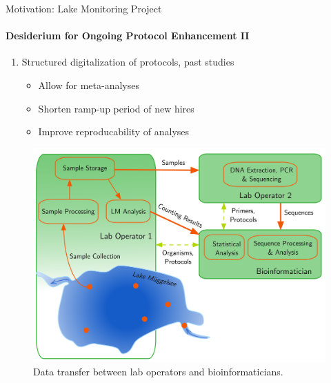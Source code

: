 \documentclass[xcolor=dvipsnames,envcountsect]{beamer}
\begin{document}
\begin{frame}{Motivation: Lake Monitoring Project}
\framesubtitle{Desiderium for Ongoing Protocol Enhancement II}
\begin{enumerate}[II]
    \item Structured digitalization of protocols, past studies
    \begin{itemize}
        \item Allow for meta-analyses 
        \item Shorten ramp-up period of new hires %
        \item Improve reproducability of analyses
    \end{itemize}
   
\end{enumerate}
\begin{figure}\centering
    \includegraphics[scale=.45]{DB_flow}
    \caption{Data transfer between lab operators and bioinformaticians.}
\end{figure}
  
\end{frame}
\end{document}
